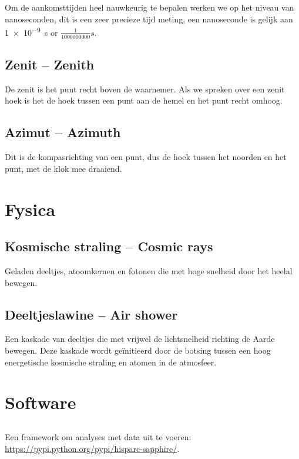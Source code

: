 Om de aankomsttijden heel nauwkeurig te bepalen werken we op het niveau
van nanoseconden, dit is een zeer precieze tijd meting, een nanoseconde
is gelijk aan \SI{1e-9}{\second} or $\frac{1}{1000000000} s$.


\subsection{Zenit -- Zenith}

De zenit is het punt recht boven de waarnemer. Als we spreken over een
zenit hoek is het de hoek tussen een punt aan de hemel en het punt recht
omhoog.


\subsection{Azimut -- Azimuth}

Dit is de kompasrichting van een punt, dus de hoek tussen het noorden en
het punt, met de klok mee draaiend.


\section{Fysica}


\subsection{Kosmische straling -- Cosmic rays}

Geladen deeltjes, atoomkernen en fotonen die met hoge snelheid door
het heelal bewegen.


\subsection{Deeltjeslawine -- Air shower}

Een kaskade van deeltjes die met vrijwel de lichtsnelheid richting de
Aarde bewegen. Deze kaskade wordt geïnitieerd door de botsing tussen een
hoog energetische kosmische straling en atomen in de atmosfeer.


\section{Software}


\subsection{\sapphire}

Een \python framework om analyses met \hisparc data uit te voeren:
\url{https://pypi.python.org/pypi/hisparc-sapphire/}.



